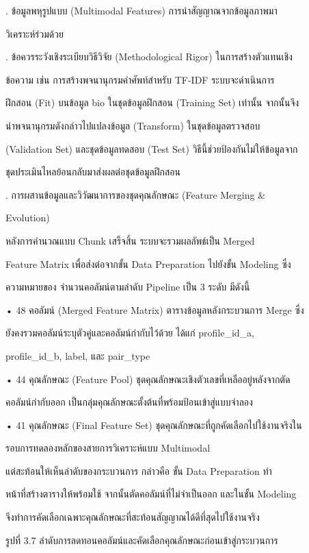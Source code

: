 \documentclass[12pt,a4paper]{report}
\begin{document}
. ข้อมูลพหุรูปแบบ (Multimodal Features) การนำสัญญาณจากข้อมูลภาพมา\par
วิเคราะห์ร่วมด้วย\par
{}. ข้อควรระวังเชิงระเบียบวิธีวิจัย (Methodological Rigor) ในการสร้างตัวแทนเชิง\par
ข้อความ เช่น การสร้างพจนานุกรมคำศัพท์สำหรับ TF-IDF ระบบจะดำเนินการ\par
ฝึกสอน (Fit) บนข้อมูล bio ในชุดข้อมูลฝึกสอน (Training Set) เท่านั้น จากนั้นจึง\par
นำพจนานุกรมดังกล่าวไปแปลงข้อมูล (Transform) ในชุดข้อมูลตรวจสอบ\par
(Validation Set) และชุดข้อมูลทดสอบ (Test Set) วิธีนี้ช่วยป้องกันไม่ให้ข้อมูลจาก\par
ชุดประเมินไหลย้อนกลับมาส่งผลต่อชุดข้อมูลฝึกสอน\par
{}. การผสานข้อมูลและวิวัฒนาการของชุดคุณลักษณะ (Feature Merging \&\par
Evolution)\par
หลังการคำนวณแบบ Chunk เสร็จสิ้น ระบบจะรวมผลลัพธ์เป็น Merged\par
Feature Matrix เพื่อส่งต่อจากขั้น Data Preparation ไปยังขั้น Modeling ซึ่ง\par
ความหมายของ จำนวนคอลัมน์ตามลำดับ Pipeline เป็น 3 ระดับ มีดังนี้\par
\noindent • 48 คอลัมน์ (Merged Feature Matrix) ตารางข้อมูลหลังกระบวนการ Merge ซึ่ง\par
ยังคงรวมคอลัมน์ระบุตัวคู่และคอลัมน์กำกับไว้ด้วย ได้แก่ profile\_id\_a,\par
profile\_id\_b, label, และ pair\_type\par
\noindent • 44 คุณลักษณะ (Feature Pool) ชุดคุณลักษณะเชิงตัวเลขที่เหลืออยู่หลังจากตัด\par
คอลัมน์กำกับออก เป็นกลุ่มคุณลักษณะตั้งต้นที่พร้อมป้อนเข้าสู่แบบจำลอง\par
\clearpage
\noindent • 41 คุณลักษณะ (Final Feature Set) ชุดคุณลักษณะที่ถูกคัดเลือกไปใช้งานจริงใน\par
รอบการทดลองหลักของสายการวิเคราะห์แบบ Multimodal\par
แต่สะท้อนให้เห็นลำดับของกระบวนการ กล่าวคือ ขั้น Data Preparation ทำ\par
หน้าที่สร้างตารางให้พร้อมใช้ จากนั้นตัดคอลัมน์ที่ไม่จำเป็นออก และในขั้น Modeling\par
จึงทำการคัดเลือกเฉพาะคุณลักษณะที่สะท้อนสัญญาณได้ดีที่สุดไปใช้งานจริง\par
\begin{center}\small รูปที่ 3.7 ลำดับการลดทอนคอลัมน์และคัดเลือกคุณลักษณะก่อนเข้าสู่กระบวนการ\end{center}
\end{document}
